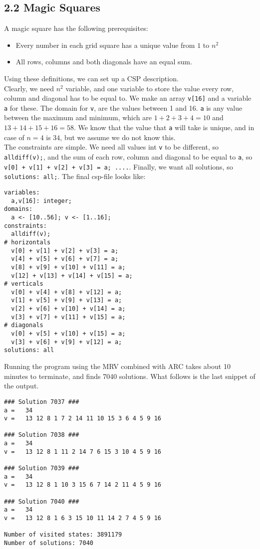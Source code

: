 \documentclass{article}
\begin{document}
\subsection*{2.2 \hspace*{0.3cm} Magic Squares}
A magic square has the following prerequisites:
\begin{itemize}
    \item Every number in each grid square has a unique value from $1$ to $n^2$
    \item All rows, columns and both diagonals have an equal sum.
\end{itemize}
Using these definitions, we can set up a CSP description.\\
Clearly, we need $n^2$ variable, and one variable to store the value every row, column and diagonal has to be equal to. We make an array \verb|v[16]| and a variable \verb|a| for these. The domain for \verb|v|, are the values between 1 and 16. \verb|a| is any value between the maximum and minimum, which are $1+2+3+4=10$ and $13+14+15+16=58$. We know that the value that \verb|a| will take is unique, and in case of $n=4$ is $34$, but we assume we do not know this.\\
The constraints are simple. We need all values int \verb|v| to be different, so \verb|alldiff(v);|, and the sum of each row, column and diagonal to be equal to \verb|a|, so \verb|v[0] + v[1] + v[2] + v[3] = a; ....|. Finally, we want all solutions, so \verb|solutions: all;|. The final csp-file looks like:
\begin{verbatim}
variables:
  a,v[16]: integer;
domains:
  a <- [10..56]; v <- [1..16];
constraints: 
  alldiff(v);
# horizontals
  v[0] + v[1] + v[2] + v[3] = a;
  v[4] + v[5] + v[6] + v[7] = a;
  v[8] + v[9] + v[10] + v[11] = a;
  v[12] + v[13] + v[14] + v[15] = a;
# verticals
  v[0] + v[4] + v[8] + v[12] = a;
  v[1] + v[5] + v[9] + v[13] = a;
  v[2] + v[6] + v[10] + v[14] = a;
  v[3] + v[7] + v[11] + v[15] = a;
# diagonals
  v[0] + v[5] + v[10] + v[15] = a;
  v[3] + v[6] + v[9] + v[12] = a;
solutions: all
\end{verbatim}
Running the program using the MRV combined with ARC takes about 10 minutes to terminate, and finds 7040 solutions. What follows is the last snippet of the output.
\begin{verbatim}
### Solution 7037 ###
a =   34 
v =   13 12 8 1 7 2 14 11 10 15 3 6 4 5 9 16 

### Solution 7038 ###
a =   34 
v =   13 12 8 1 11 2 14 7 6 15 3 10 4 5 9 16 

### Solution 7039 ###
a =   34 
v =   13 12 8 1 10 3 15 6 7 14 2 11 4 5 9 16 

### Solution 7040 ###
a =   34 
v =   13 12 8 1 6 3 15 10 11 14 2 7 4 5 9 16 

Number of visited states: 3891179
Number of solutions: 7040
\end{verbatim}
\end{document}
